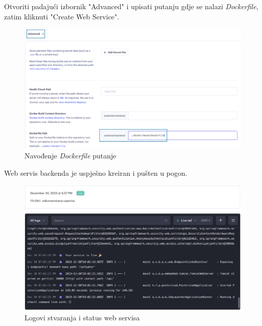 			Otvoriti padajući izbornik "Advanced" i upisati putanju gdje se nalazi \textit{Dockerfile}, zatim kliknuti "Create Web Service".
			\begin{figure}[H]
				\includegraphics[scale=0.35]{slike/deploy/backend5.png} %
				\centering
				\caption{Navođenje \textit{Dockerfile} putanje}
				\label{fig:promjene}
			\end{figure}
			
			Web servis backenda je uspješno kreiran i pušten u pogon.
			\begin{figure}[H]
				\includegraphics[scale=0.4]{slike/deploy/backend6.png} %
				\centering
				\caption{Logovi stvaranja i status web servisa}
				\label{fig:promjene}
			\end{figure}
			
			
			
			
			\eject 